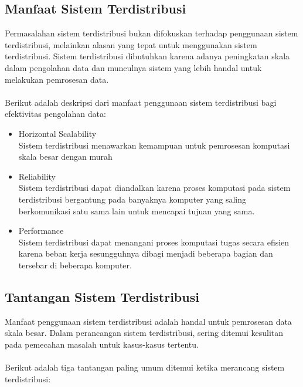 \subsection{Manfaat Sistem Terdistribusi}
Permasalahan sistem terdistribusi bukan difokuskan terhadap penggunaan sistem terdistribusi, melainkan alasan yang tepat untuk menggunakan sistem terdistribusi. Sistem terdistribusi dibutuhkan karena adanya peningkatan skala dalam pengolahan data dan munculnya sistem yang lebih handal untuk melakukan pemrosesan data. 
\\\\
Berikut adalah deskripsi dari manfaat penggunaan sistem terdistribusi bagi efektivitas pengolahan data:

\begin{itemize}
\item Horizontal Scalability\\
Sistem terdistribusi menawarkan kemampuan untuk  pemrosesan komputasi skala besar dengan murah

\item Reliability\\
Sistem terdistribusi dapat diandalkan karena proses komputasi pada sistem terdistribusi bergantung pada banyaknya komputer yang saling berkomunikasi satu sama lain untuk mencapai tujuan yang sama.
 
\item Performance\\
Sistem terdistribusi dapat menangani proses komputasi tugas secara efisien karena beban kerja sesungguhnya dibagi menjadi beberapa bagian dan tersebar di beberapa komputer. 
\end{itemize}

\subsection{Tantangan Sistem Terdistribusi} 
Manfaat penggunaan sistem terdistribusi adalah handal untuk pemrosesan data skala besar. Dalam perancangan sistem terdistribusi, sering ditemui kesulitan pada pemecahan masalah untuk kasus-kasus tertentu. 
\\\\
Berikut adalah tiga tantangan paling umum ditemui ketika merancang sistem terdistribusi:

